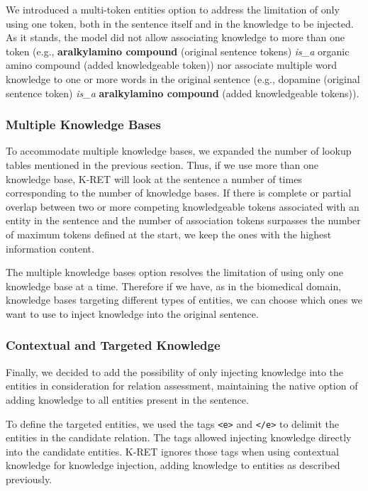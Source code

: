 We introduced a multi-token entities option to address the limitation of only using one token, both in the sentence itself and in the knowledge to be injected. As it stands, the model did not allow associating knowledge to more than one token (e.g., \textbf{aralkylamino compound} (original sentence tokens) \textit{is\_a} organic amino compound (added knowledgeable token)) nor associate multiple word knowledge to one or more words in the original sentence (e.g., dopamine (original sentence token) \textit{is\_a} \textbf{aralkylamino compound} (added knowledgeable tokens)). 


\subsubsection{Multiple Knowledge Bases}

To accommodate multiple knowledge bases, we expanded the number of lookup tables mentioned in the previous section. Thus, if we use more than one knowledge base, K-RET will look at the sentence a number of times corresponding to the number of knowledge bases. If there is complete or partial overlap between two or more competing knowledgeable tokens associated with an entity in the sentence and the number of association tokens surpasses the number of maximum tokens defined at the start, we keep the ones with the highest information content. 

The multiple knowledge bases option resolves the limitation of using only one knowledge base at a time. Therefore if we have, as in the biomedical domain, knowledge bases targeting different types of entities, we can choose which ones we want to use to inject knowledge into the original sentence. 


\subsubsection{Contextual and Targeted Knowledge}

Finally, we decided to add the possibility of only injecting knowledge into the entities in consideration for relation assessment, maintaining the native option of adding knowledge to all entities present in the sentence. 

To define the targeted entities, we used the tags \texttt{<e>} and \texttt{</e>} to delimit the entities in the candidate relation. The tags allowed injecting knowledge directly into the candidate entities. K-RET ignores those tags when using contextual knowledge for knowledge injection, adding knowledge to entities as described previously. 

